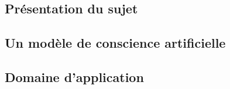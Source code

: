 \subsection{Présentation du sujet}


\subsection{Un modèle de conscience artificielle}


\subsection{Domaine d'application}



